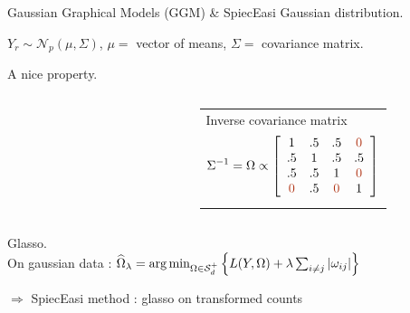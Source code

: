 \documentclass{beamer}
\newcommand{\edgeunit}{1.5}
\newcommand{\emphase}[1]{\textcolor{Complement}{#1}}
\newcommand{\Ncal}{\mathcal{N}}
\begin{document}
\begin{frame}{Gaussian Graphical Models (GGM) \& SpiecEasi}
   \emphase{Gaussian distribution.}\\
 \begin{center}
	$  Y_r \sim \Ncal_p(\mu, \Sigma) $, $\mu =$ vector of means, $\Sigma =$ covariance matrix.
\end{center}
  
 
  
   \bigskip %
  \emphase{A nice property.} ~ \\

  \begin{columns}
  \begin{column}{0.05\textwidth}
	
\end{column}
  \begin{column}{0.4\textwidth}
    \end{column}
    \begin{column}{12cm}
    \begin{tabular}{p{}}
	 Inverse covariance matrix
	 $$
	 \Sigma^{-1} = \Omega \propto \left[ \begin{array}{cccc}
	   1 & .5 & .5 & \emphase{0} \\
	   .5 & 1 & .5 & .5 \\
	   .5 & .5 & 1 & \emphase{0} \\
	   \emphase{0} & .5& \emphase{0}  & 1
	   \end{array} \right] 
	 $$
    \end{tabular} 
   
  \end{column}
  \end{columns}
 \emphase{Glasso.}\\\bigskip
 On gaussian data : $\widehat{\Omega}_\lambda = \arg\min_{\Omega \in \mathcal{S}_d^+}\left\{ L(Y,\Omega)+\lambda \sum_{i\neq j} |\omega_{ij}| \right\} \hspace{0.5cm} $\\
 \begin{center}
	$\Rightarrow$ {\color{Framableulight}SpiecEasi method \cite{kurtz}}: glasso on transformed counts
\end{center}


\end{frame}
\end{document}
